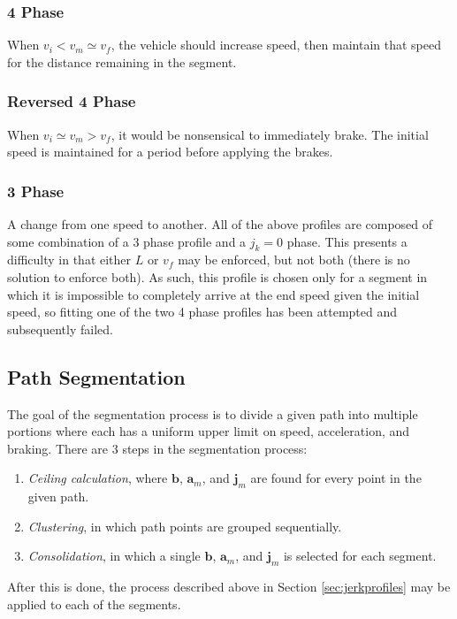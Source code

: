 \documentclass[letterpaper, 10 pt, conference]{ieeeconf}  %
\begin{document}
\subsubsection{4 Phase} \label{sec:4phase}

When $v_i < v_m \simeq v_f$, the vehicle should increase speed, then maintain that speed for the distance remaining in the segment.


\subsubsection{Reversed 4 Phase} \label{sec:reversed4phase}

When $v_i \simeq v_m > v_f$, it would be nonsensical to immediately brake.
The initial speed is maintained for a period before applying the brakes.


\subsubsection{3 Phase} \label{sec:3phase}

A change from one speed to another.
All of the above profiles are composed of some combination of a 3 phase profile and a $j_k = 0$ phase.
This presents a difficulty in that either $L$ or $v_f$ may be enforced, but not both (there is no solution to enforce both).
As such, this profile is chosen only for a segment in which it is impossible to completely arrive at the end speed given the initial speed, so fitting one of the two 4 phase profiles has been attempted and subsequently failed.



\subsection{Path Segmentation} \label{sec:pathsegmentation}

The goal of the segmentation process is to divide a given path into multiple portions where each has a uniform upper limit on speed, acceleration, and braking.
There are 3 steps in the segmentation process:
\begin{enumerate} \label{asdf}
  \item \emph{Ceiling calculation}, where $\mathbf{b}$, $\mathbf{a}_m$, and $\mathbf{j}_m$ are found for every point in the given path.
  \item \emph{Clustering}, in which path points are grouped sequentially.
  \item \emph{Consolidation}, in which a single $\mathbf{b}$, $\mathbf{a}_m$, and $\mathbf{j}_m$ is selected for each segment.
\end{enumerate}
After this is done, the process described above in Section \ref{sec:jerkprofiles} may be applied to each of the segments.
\end{document}
